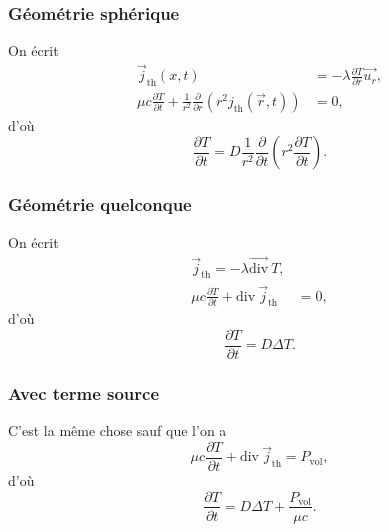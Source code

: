         \subsubsection{Géométrie sphérique}
            
            On écrit 
            \begin{equation}
                \begin{aligned}
                    \vec{j}_{\text{th}}(x,t)&=-\lambda\frac{\partial T}{\partial r}\vec{u_r},\\
                    \mu c\frac{\partial T}{\partial t}+\frac{1}{r^{2}}\frac{\partial}{\partial r}\left(r^{2}j_{\text{th}}(\vec{r},t)\right)&=0,
                \end{aligned}
            \end{equation}
            d'où
            \begin{equation}
                \boxed{
                    \frac{\partial T}{\partial t}=D\frac{1}{r^{2}}\frac{\partial}{\partial t}\left(r^{2}\frac{\partial T}{\partial t}\right).
                }
            \end{equation}
        
        \subsubsection{Géométrie quelconque}
            
            On écrit
            \begin{equation}
                \begin{aligned}
                    \vec{j}_{\text{th}}=-\lambda\vec{\mathrm{div}}~T,\\
                    \mu c\frac{\partial T}{\partial t}+\mathrm{div}~\vec{j}_{\text{th}}&=0,
                \end{aligned}
            \end{equation}
            d'où
            \begin{equation}
                \boxed{
                    \frac{\partial T}{\partial t}=D\Delta T.
                }
            \end{equation}

        \subsubsection{Avec terme source}

            C'est la même chose sauf que l'on a 
            \begin{equation}
                \mu c\frac{\partial T}{\partial t}+\mathrm{div}~\vec{j}_{\text{th}}=P_{\text{vol}},
            \end{equation}
            d'où
            \begin{equation}
                \boxed{
                    \frac{\partial T}{\partial t}=D\Delta T+\frac{P_{\text{vol}}}{\mu c}.
                }
            \end{equation}

